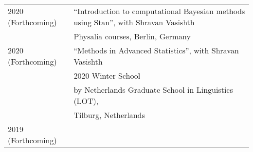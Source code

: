 \documentclass[]{article}
\begin{document}
\begin{longtable}[]{@{}ll@{}}
\toprule
\endhead
\begin{minipage}[t]{0.25\columnwidth}\raggedright
2020 (Forthcoming)\strut
\end{minipage} & \begin{minipage}[t]{0.69\columnwidth}\raggedright
``Introduction to computational Bayesian methods using Stan'', with
Shravan Vasishth\strut
\end{minipage}\tabularnewline
\begin{minipage}[t]{0.25\columnwidth}\raggedright
\strut
\end{minipage} & \begin{minipage}[t]{0.69\columnwidth}\raggedright
Physalia courses, Berlin, Germany\vspace{.1cm}\strut
\end{minipage}\tabularnewline
\begin{minipage}[t]{0.25\columnwidth}\raggedright
2020 (Forthcoming)\strut
\end{minipage} & \begin{minipage}[t]{0.69\columnwidth}\raggedright
``Methods in Advanced Statistics'', with Shravan Vasishth\strut
\end{minipage}\tabularnewline
\begin{minipage}[t]{0.25\columnwidth}\raggedright
\strut
\end{minipage} & \begin{minipage}[t]{0.69\columnwidth}\raggedright
2020 Winter School\strut
\end{minipage}\tabularnewline
\begin{minipage}[t]{0.25\columnwidth}\raggedright
\strut
\end{minipage} & \begin{minipage}[t]{0.69\columnwidth}\raggedright
by Netherlands Graduate School in Linguistics (LOT),\strut
\end{minipage}\tabularnewline
\begin{minipage}[t]{0.25\columnwidth}\raggedright
\strut
\end{minipage} & \begin{minipage}[t]{0.69\columnwidth}\raggedright
Tilburg, Netherlands\vspace{.1cm}\strut
\end{minipage}\tabularnewline
\begin{minipage}[t]{0.25\columnwidth}\raggedright
2019 (Forthcoming)\strut
\end{minipage} & \begin{minipage}[t]{0.69\columnwidth}\raggedright

\end{minipage}
\end{longtable}
\end{document}
